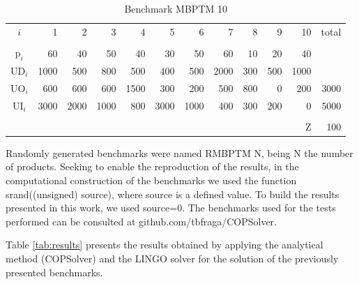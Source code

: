 \documentclass[10pt,fleqn,a4paper,twoside]{article}
\begin{document}
\begin{table}[h]
\begin{center}
\begin{small}
\begin{tabular}[c]{c r r r r r r r r r r r }
$i$ & 1 & 2 & 3 & 4 & 5 & 6 & 7 & 8 & 9 & 10 & total \\
\cline {1-12} \\
$\textrm{p}_i$ & 60 & 40 & 50 & 40 & 30 & 50 & 60 & 10 & 20 & 40\\
$\textrm{UD}_i$ & 1000 & 500 & 800 & 500 & 400 & 500 & 2000 & 300 & 500 & 1000 \\
$\textrm{UO}_i$ & 600 & 600 & 600 & 1500 & 300 & 200 & 500 & 800 & 0 & 200 & 3000 \\
$\textrm{UI}_i$ & 3000 & 2000 & 1000 & 800 & 3000 & 1000 & 400 & 300 & 200 & 0 & 5000 \\
\cline {1-12} \\
& & & & & & & & & & $\textrm{Z}$ & 100 \\
\end{tabular}
\caption{Benchmark MBPTM 10}
\label{tab:MBPTMP003}
\end{small}
\end{center}
\end{table}

Randomly generated benchmarks were named RMBPTM $\textrm{N}$, being $\textrm{N}$ the number of products. Seeking to enable the reproduction of the results, in the computational construction of the benchmarks we used the function srand((unsigned) source), where source is a defined value. To build the results presented in this work, we used source=0. The benchmarks used for the tests performed can be consulted at github.com/tbfraga/COPSolver.

Table \ref{tab:results} presents the results obtained by applying the analytical method (COPSolver) and the LINGO solver for the solution of the previously presented benchmarks.
\end{document}
